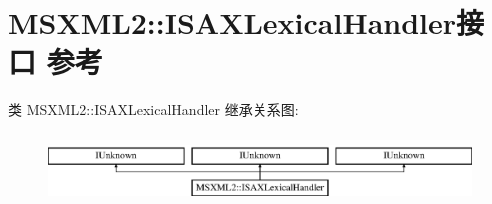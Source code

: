 \hypertarget{interface_m_s_x_m_l2_1_1_i_s_a_x_lexical_handler}{}\section{M\+S\+X\+M\+L2\+:\+:I\+S\+A\+X\+Lexical\+Handler接口 参考}
\label{interface_m_s_x_m_l2_1_1_i_s_a_x_lexical_handler}
类 M\+S\+X\+M\+L2\+:\+:I\+S\+A\+X\+Lexical\+Handler 继承关系图\+:\begin{figure}[H]
\begin{center}
\leavevmode
\includegraphics[height=1.934370cm]{interface_m_s_x_m_l2_1_1_i_s_a_x_lexical_handler}
\end{center}
\end{figure}
